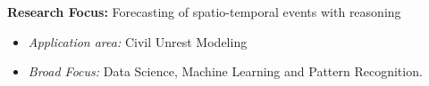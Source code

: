 
\vspace{1em}
\textbf{Research Focus: } Forecasting of spatio-temporal events with reasoning
\begin{itemize}[nosep]
    \item \textit{Application area:} Civil Unrest Modeling
  \item \textit{Broad Focus:} Data Science, Machine Learning and Pattern Recognition.
\end{itemize}

